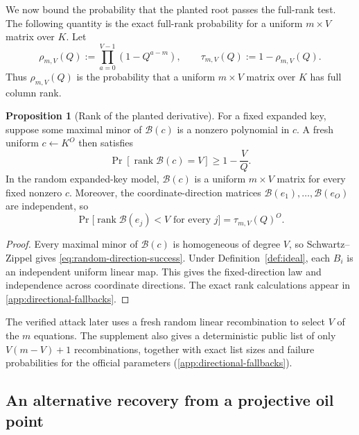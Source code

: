 \documentclass[11pt,a4paper]{article}
\theoremstyle{definition}
\newtheorem{proposition}[theorem]{Proposition}
\theoremstyle{remark}
\newcommand{\rank}{\operatorname{rank}}
\begin{document}
We now bound the probability that the planted root passes the full-rank test.
The following quantity is the exact full-rank probability for a uniform
$m\times V$ matrix over $K$.  Let
\begin{equation}\label{eq:rho-mv}
 \rho_{m,V}(Q):=\prod_{a=0}^{V-1}(1-Q^{a-m}),
 \qquad
 \tau_{m,V}(Q):=1-\rho_{m,V}(Q).
\end{equation}
Thus $\rho_{m,V}(Q)$ is the probability that a uniform $m\times V$ matrix over
$K$ has full column rank.

\begin{proposition}[Rank of the planted derivative]\label{prop:graph-direction-density}
For a fixed expanded key, suppose some maximal minor of $\mathcal B(c)$ is a
nonzero polynomial in $c$.  A fresh uniform $c\leftarrow K^O$ then satisfies
\begin{equation}\label{eq:random-direction-success}
 \Pr[\rank\mathcal B(c)=V]\ge1-\frac VQ.
\end{equation}
In the random expanded-key model, $\mathcal B(c)$ is a uniform $m\times V$ matrix for
every fixed nonzero $c$.  Moreover, the coordinate-direction matrices
$\mathcal B(e_1),\ldots,\mathcal B(e_O)$ are independent, so
\begin{equation}\label{eq:all-coordinate-directions-bad}
 \Pr\bigl[\rank\mathcal B(e_j)<V\text{ for every }j\bigr]
 =\tau_{m,V}(Q)^O.
\end{equation}
\end{proposition}

\begin{proof}
Every maximal minor of $\mathcal B(c)$ is homogeneous of degree $V$, so
Schwartz--Zippel gives \eqref{eq:random-direction-success}.  Under
Definition~\ref{def:ideal}, each $B_i$ is an independent uniform linear map.
This gives the fixed-direction law and independence across coordinate
directions.  The exact rank calculations appear in
\cref{app:directional-fallbacks}.
\end{proof}

The verified attack later uses a fresh random linear recombination to select
$V$ of the $m$ equations.  The supplement also gives a deterministic public
list of only $V(m-V)+1$ recombinations, together with exact list sizes and
failure probabilities for the official parameters
(\cref{app:directional-fallbacks}).

\subsection{An alternative recovery from a projective oil point}
\end{document}
